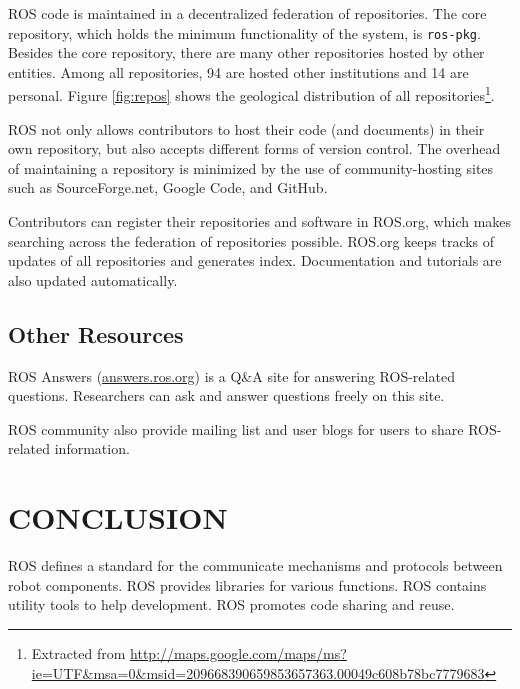 \documentclass[a4paper, 10pt, conference]{ieeeconf}       %
\begin{document}
ROS code is maintained in a decentralized federation of repositories. The core repository, which holds the minimum functionality of the system, is \texttt{ros-pkg}. Besides the core repository, there are many other repositories hosted by other entities. Among all repositories, 94 are hosted other institutions and 14 are personal. Figure \ref{fig:repos} shows the geological distribution of all repositories\footnote{Extracted from \url{http://maps.google.com/maps/ms?ie=UTF\&msa=0\&msid=209668390659853657363.00049c608b78bc7779683}}.

ROS not only allows contributors to host their code (and documents) in their own repository, but also accepts different forms of version control. The overhead of maintaining a repository is minimized by the use of community-hosting sites such as SourceForge.net, Google
Code, and GitHub.

Contributors can register their repositories and software in ROS.org, which makes searching across the federation of repositories possible. ROS.org keeps tracks of updates of all repositories and generates index. Documentation and tutorials are also updated automatically.


\subsection{Other Resources}
ROS Answers (\url{answers.ros.org}) is a Q\&A site for answering ROS-related questions. Researchers can ask and answer questions freely on this site.

ROS community also provide mailing list and user blogs for users to share ROS-related information.

\section{CONCLUSION}

   ROS defines a standard for the communicate mechanisms and protocols between robot components.
   ROS provides libraries for various functions.
   ROS contains utility tools to help development.
   ROS promotes code sharing and reuse.



  
\end{document}
